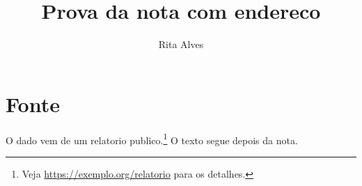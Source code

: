 \documentclass[11pt,a4paper]{article}
\title{Prova da nota com endereco}
\author{Rita Alves}
\begin{document}
\maketitle
\section{Fonte}
O dado vem de um relatorio publico.\footnote{Veja \url{https://exemplo.org/relatorio} para os detalhes.} O texto segue depois da nota.
\end{document}
